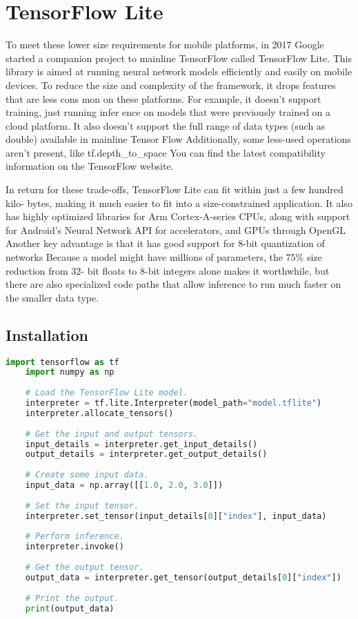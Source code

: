 \section{TensorFlow Lite}
To meet these lower size requirements for mobile platforms, in 2017 Google started a companion project to mainline TensorFlow called TensorFlow Lite. This library is aimed at running neural network models efficiently and easily on mobile devices. To reduce the size and complexity of the framework, it drops features that are less cons mon on these platforms. For example, it doesn't support training, just running infer ence on models that were previously trained on a cloud platform. It also doesn't support the full range of data types (such as double) available in mainline Tensor Flow Additionally, some less-used operations aren't present, like tf.depth\_to\_space You can find the latest compatibility information on the TensorFlow website.

In return for these trade-offs, TensorFlow Lite can fit within just a few hundred kilo- bytes, making it much easier to fit into a size-constrained application. It also has highly optimized libraries for Arm Cortex-A-series CPUs, along with support for Android's Neural Network API for accelerators, and GPUs through OpenGL Another key advantage is that it has good support for 8-bit quantization of networks Because a model might have millions of parameters, the 75\% size reduction from 32- bit floats to 8-bit integers alone makes it worthwhile, but there are also specialized code paths that allow inference to run much faster on the smaller data type.\cite{TensorFlow:2023}



\subsection{Installation}

\begin{lstlisting}[language=Python, caption={Load and Run TensorFlow Lite Model}, label={code:tflite-inference}, style=pythonstyle]
	import tensorflow as tf
	import numpy as np
	
	# Load the TensorFlow Lite model.
	interpreter = tf.lite.Interpreter(model_path="model.tflite")
	interpreter.allocate_tensors()
	
	# Get the input and output tensors.
	input_details = interpreter.get_input_details()
	output_details = interpreter.get_output_details()
	
	# Create some input data.
	input_data = np.array([[1.0, 2.0, 3.0]])
	
	# Set the input tensor.
	interpreter.set_tensor(input_details[0]["index"], input_data)
	
	# Perform inference.
	interpreter.invoke()
	
	# Get the output tensor.
	output_data = interpreter.get_tensor(output_details[0]["index"])
	
	# Print the output.
	print(output_data)
\end{lstlisting}



